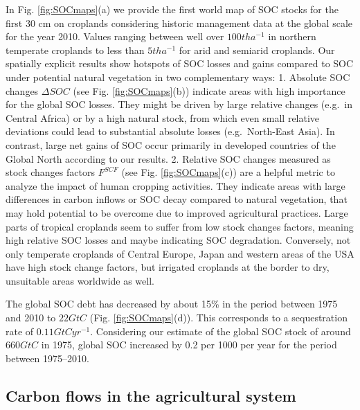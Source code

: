 \documentclass[gc, manuscript]{copernicus}
\begin{document}
In Fig. \ref{fig:SOCmaps}(a) we provide the first world map of SOC stocks for the first 30 cm on croplands considering historic management data at the global scale for the year 2010. Values ranging between well over \(100\unit{t ha^{-1}}\) in northern temperate croplands to less than \(5\unit{t ha^{-1}}\) for arid and semiarid croplands.
Our spatially explicit results show hotspots of SOC losses and gains compared to SOC under potential natural vegetation in two complementary ways:
1. Absolute SOC changes \(\Delta SOC\) (see Fig. \ref{fig:SOCmaps}(b)) indicate areas with high importance for the global SOC losses. They might be driven by large relative changes (e.g.~in Central Africa) or by a high natural stock, from which even small relative deviations could lead to substantial absolute losses (e.g.~North-East Asia). In contrast, large net gains of SOC occur primarily in developed countries of the Global North according to our results.
2. Relative SOC changes measured as stock changes factors \(F^{SCF}\) (see Fig. \ref{fig:SOCmaps}(c)) are a helpful metric to analyze the impact of human cropping activities. They indicate areas with large differences in carbon inflows or SOC decay compared to natural vegetation, that may hold potential to be overcome due to improved agricultural practices. Large parts of tropical croplands seem to suffer from low stock changes factors, meaning high relative SOC losses and maybe indicating SOC degradation. Conversely, not only temperate croplands of Central Europe, Japan and western areas of the USA have high stock change factors, but irrigated croplands at the border to dry, unsuitable areas worldwide as well.

The global SOC debt has decreased by about 15\% in the period between 1975 and 2010 to \(22\unit{GtC}\) (Fig. \ref{fig:SOCmaps}(d)). This corresponds to a sequestration rate of \(0.11\unit{GtC yr^{-1}}\). Considering our estimate of the global SOC stock of around \(660\unit{GtC}\) in 1975, global SOC increased by 0.2 per 1000 per year for the period between 1975--2010.

\hypertarget{carbon-flows-in-the-agricultural-system}{%
\subsection{Carbon flows in the agricultural system}\label{carbon-flows-in-the-agricultural-system}}
\end{document}
